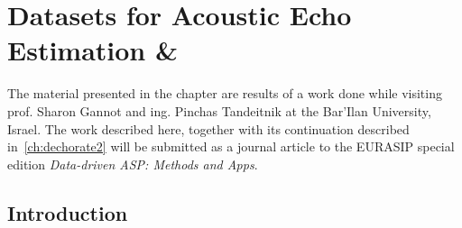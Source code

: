\chapter{Datasets for Acoustic Echo Estimation \& }\label{ch:dechorate}

\vspace{-2.5em}

 \synopsisChDechorate


\mynewline
The material presented in the chapter are results of a work done while visiting prof. Sharon Gannot and ing. Pinchas Tandeitnik at the Bar'Ilan University, Israel.
The work described here, together with its continuation described in~\cref{ch:dechorate2} will be submitted as a journal article to the EURASIP special edition \textit{Data-driven ASP: Methods and Apps}.


\section{Introduction}\label{sec:dechorate:intro}


